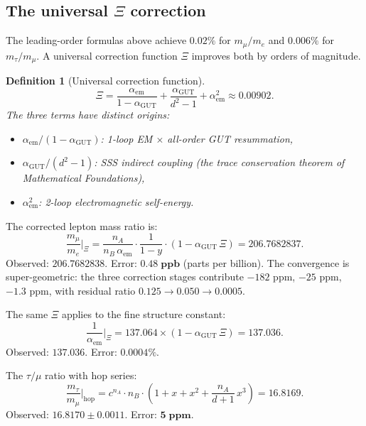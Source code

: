 \documentclass[12pt]{article}
\newtheorem{definition}[theorem]{Definition}
\theoremstyle{remark}
\theoremstyle{definition}
\newcommand{\agut}{\alpha_{\mathrm{GUT}}}
\begin{document}
\subsection{The universal $\Xi$ correction}
\label{sec:xi_correction}

The leading-order formulas above achieve $0.02\%$ for $m_\mu/m_e$ and $0.006\%$ for $m_\tau/m_\mu$.  A universal correction function $\Xi$ improves both by orders of magnitude.

\begin{definition}[Universal correction function]
\begin{equation}
\Xi = \frac{\alpha_\mathrm{em}}{1 - \alpha_\mathrm{GUT}} + \frac{\alpha_\mathrm{GUT}}{d^2 - 1} + \alpha_\mathrm{em}^2 \approx 0.00902.
\end{equation}
The three terms have distinct origins:
\begin{itemize}
\item $\alpha_\mathrm{em}/(1 - \agut)$: 1-loop EM $\times$ all-order GUT resummation,
\item $\agut/(d^2 - 1)$: SSS indirect coupling (the trace conservation theorem of \textit{Mathematical Foundations}),
\item $\alpha_\mathrm{em}^2$: 2-loop electromagnetic self-energy.
\end{itemize}
\end{definition}

The corrected lepton mass ratio is:
\begin{equation}
\boxed{\frac{m_\mu}{m_e}\bigg|_{\Xi} = \frac{n_A}{n_B\,\alpha_\mathrm{em}} \cdot \frac{1}{1 - y} \cdot (1 - \agut\,\Xi) = 206.7682837.}
\end{equation}
Observed: $206.7682838$.  Error: $\mathbf{0.48\;\text{ppb}}$ (parts per billion).  The convergence is super-geometric: the three correction stages contribute $-182$ ppm, $-25$ ppm, $-1.3$ ppm, with residual ratio $0.125 \to 0.050 \to 0.0005$.

The same $\Xi$ applies to the fine structure constant:
\begin{equation}
\frac{1}{\alpha_\mathrm{em}}\bigg|_{\Xi} = 137.064 \times (1 - \agut\,\Xi) = 137.036.
\end{equation}
Observed: $137.036$.  Error: $\mathbf{0.0004\%}$.

The $\tau/\mu$ ratio with hop series:
\begin{equation}
\frac{m_\tau}{m_\mu}\bigg|_{\text{hop}} = c^{n_A}\cdot n_B \cdot \left(1 + x + x^2 + \frac{n_A}{d+1}\,x^3\right) = 16.8169.
\end{equation}
Observed: $16.8170 \pm 0.0011$.  Error: $\mathbf{5\;\text{ppm}}$.
\end{document}
